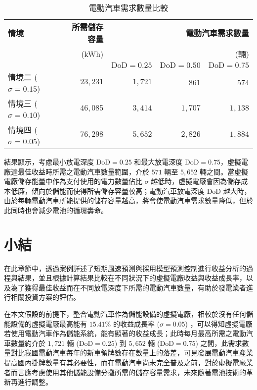 \begin{table}[htbp]
  \centering
  \caption[電動汽車需求數量比較]{電動汽車需求數量比較}
  \begin{tabular}{lrrrr}
    \toprule
    \textbf{情境} & \textbf{所需儲存容量} & \multicolumn{3}{r}{\textbf{電動汽車需求數量}} \\
                  & (\si{kWh}) & \multicolumn{3}{r}{(輛)} \\ \cmidrule{3-5}
                  &            & $\text{DoD}=0.25$ & $\text{DoD}=0.50$ & $\text{DoD}=0.75$ \\
    \midrule
    情境二 ($\sigma = 0.15$)  & $23,231$ & $1,721$ & $861$ & $574$ \\
    情境三 ($\sigma = 0.10$)  & $46,085$ & $3,414$ & $1,707$ & $1,138$ \\
    情境四 ($\sigma = 0.05$)  & $76,298$ & $5,652$ & $2,826$ & $1,884$ \\
    \bottomrule
  \end{tabular}
  \label{table: Electric Vehicles Quantity Required}
\end{table}

結果顯示，考慮最小放電深度 $\text{DoD} = 0.25$ 和最大放電深度 $\text{DoD} = 0.75$，虛擬電廠達最佳收益時所需之電動汽車數量範圍，介於 $571$ 輛至 $5,652$ 輛之間。當虛擬電廠儲存能量中作為支付使用的電力數量佔比 $\sigma$ 越低時，虛擬電廠會因為儲存成本低廉，傾向於儲能而使得所需儲存容量較高；電動汽車放電深度 $\text{DoD}$ 越大時，由於每輛電動汽車所能提供的儲存容量越高，將會使電動汽車需求數量降低，但於此同時也會減少電池的循環壽命。


\section{小結}

在此章節中，透過案例詳述了短期風速預測與採用模型預測控制進行收益分析的過程與結果，並且根據計算結果比較在不同狀況下的虛擬電廠收益與收益成長率，以及為了獲得最佳收益而在不同放電深度下所需的電動汽車數量，有助於發電業者進行相關投資方案的評估。

在本文假設的前提下，整合電動汽車作為儲能設備的虛擬電廠，相較於沒有任何儲能設備的虛擬電廠最高能有 $15.41\%$ 的收益成長率 ($\sigma = 0.05$) ，可以得知虛擬電廠若使用電動汽車作為儲能系統，能有顯著的收益成長；此時每月最高所需之電動汽車數量約介於 $1,721$ 輛 ($\text{DoD} = 0.25$) 到 $5,652$ 輛 ($\text{DoD} = 0.75$) 之間，此需求數量對比我國電動汽車每年的新車領牌數存在數量上的落差，可見發展電動汽車產業提高國內掛牌數量有其必要性，而在電動汽車尚未完全普及之前，對於虛擬電廠業者而言應考慮使用其他儲能設備分攤所需的儲存容量需求，未來隨著電池技術的革新再進行調整。
